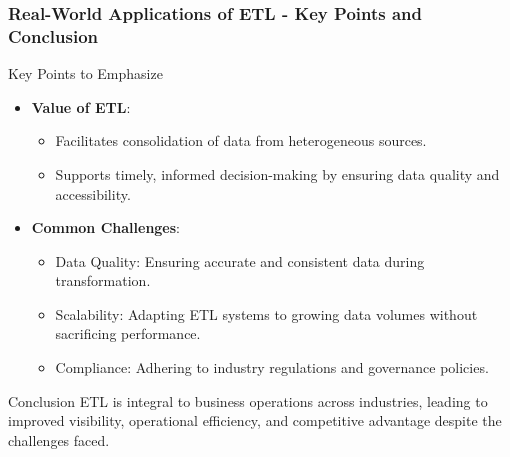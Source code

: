 \documentclass{beamer}
\begin{document}
\begin{frame}[fragile]
    \frametitle{Real-World Applications of ETL - Key Points and Conclusion}
    \begin{block}{Key Points to Emphasize}
        \begin{itemize}
            \item \textbf{Value of ETL}:
                \begin{itemize}
                    \item Facilitates consolidation of data from heterogeneous sources.
                    \item Supports timely, informed decision-making by ensuring data quality and accessibility.
                \end{itemize}
            \item \textbf{Common Challenges}:
                \begin{itemize}
                    \item Data Quality: Ensuring accurate and consistent data during transformation.
                    \item Scalability: Adapting ETL systems to growing data volumes without sacrificing performance.
                    \item Compliance: Adhering to industry regulations and governance policies.
                \end{itemize}
        \end{itemize}
    \end{block}
    
    \begin{block}{Conclusion}
        ETL is integral to business operations across industries, leading to improved visibility, operational efficiency, and competitive advantage despite the challenges faced.
    \end{block}
\end{frame}
\end{document}
